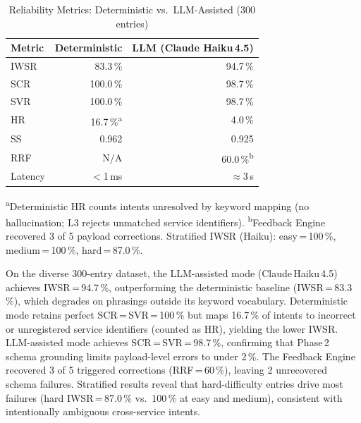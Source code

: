 \documentclass[conference]{IEEEtran}
\begin{document}
\begin{table}[t]
\centering
\caption{Reliability Metrics: Deterministic vs.\ LLM-Assisted (300 entries)}
\label{tab:results}
\small
\begin{tabular}{lrr}
\toprule
\textbf{Metric} & \textbf{Deterministic} & \textbf{LLM (Claude Haiku\,4.5)} \\
\midrule
IWSR  &  83.3\,\% &  94.7\,\% \\
SCR   & 100.0\,\% &  98.7\,\% \\
SVR   & 100.0\,\% &  98.7\,\% \\
HR    &  16.7\,\%\textsuperscript{a} &   4.0\,\% \\
SS    &     0.962 &     0.925 \\
RRF   &    N/A    &  60.0\,\%\textsuperscript{b} \\
Latency & $<$1\,ms & $\approx$3\,s \\
\bottomrule
\end{tabular}
\vspace{2pt}
\noindent\footnotesize
\textsuperscript{a}Deterministic HR counts intents unresolved by keyword
mapping (no hallucination; L3 rejects unmatched service identifiers).
\textsuperscript{b}Feedback Engine recovered 3 of 5 payload corrections.
Stratified IWSR (Haiku): easy\,=\,100\,\%, medium\,=\,100\,\%,
hard\,=\,87.0\,\%.
\end{table}

On the diverse 300-entry dataset, the LLM-assisted mode
(Claude\,Haiku\,4.5) achieves IWSR\,=\,94.7\,\%, outperforming the
deterministic baseline (IWSR\,=\,83.3\,\%), which degrades on
phrasings outside its keyword vocabulary.
Deterministic mode retains perfect SCR\,=\,SVR\,=\,100\,\% but maps
16.7\,\% of intents to incorrect or unregistered service identifiers
(counted as HR), yielding the lower IWSR.
LLM-assisted mode achieves SCR\,=\,SVR\,=\,98.7\,\%, confirming that
Phase\,2 schema grounding limits payload-level errors to under 2\,\%.
The Feedback Engine recovered 3 of 5 triggered corrections
(RRF\,=\,60\,\%), leaving 2 unrecovered schema failures.
Stratified results reveal that hard-difficulty entries drive most
failures (hard IWSR\,=\,87.0\,\% vs.\ 100\,\% at easy and medium),
consistent with intentionally ambiguous cross-service intents.
\end{document}
